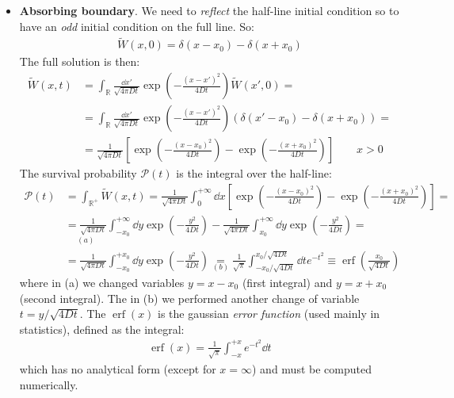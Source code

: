 \documentclass[../template.tex]{subfiles}
\begin{document}
\begin{exo}
    \begin{itemize}
        \item \textbf{Absorbing boundary}. We need to \textit{reflect} the half-line initial condition so to have an \textit{odd} initial condition on the full line. So:
        \begin{align*}
            \tilde{W}(x,0) = \delta(x-x_0)-\delta(x+x_0)
        \end{align*}   
        The full solution is then:
        \begin{align*}
            \tilde{W}(x,t) &= \int_\mathbb{R} \frac{\dd{x'}}{\sqrt{4 \pi Dt}} \exp\left(-\frac{(x-x')^2}{4Dt} \right) \tilde{W}(x',0) =\\
            &= \int_{\mathbb{R}} \frac{\dd{x'}}{\sqrt{4 \pi D t}} \exp\left(-\frac{(x-x')^2}{4Dt} \right) (\delta(x'-x_0) - \delta(x+x_0)) =\\
            &=\frac{1}{\sqrt{4 \pi D t}} \left[\exp\left(-\frac{(x-x_0)^2}{4Dt} \right) - \exp\left(-\frac{(x+x_0)^2}{4Dt} \right)\right] \qquad x>0
        \end{align*}
        The survival probability $\mathcal{P}(t)$ is the integral over the half-line:
        \begin{align}\nonumber
            \mathcal{P}(t) &= \int_{\mathbb{R}^+} \tilde{W}(x,t) =\frac{1}{\sqrt{4 \pi D t}} \int_0^{+\infty} \dd{x} \left[\exp\left(-\frac{(x-x_0)^2}{4Dt} \right) - \exp\left(-\frac{(x+x_0)^2}{4Dt} \right)\right] =\\ \nonumber
            &\underset{(a)}{=\frac{1}{\sqrt{4 \pi D t}}}  \int_{-x_0}^{+\infty} \dd{y} \exp\left(-\frac{y^2}{4Dt} \right) -\frac{1}{\sqrt{4 \pi D t}} \int_{x_0}^{+\infty} \dd{y} \exp\left(-\frac{y^2}{4Dt} \right) =\\ \label{eqn:Psurv}
            &=\frac{1}{\sqrt{4 \pi D t}} \int_{-x_0}^{+x_0} \dd{y} \exp\left(-\frac{y^2}{4Dt} \right) \underset{(b)}{=} \frac{1}{\sqrt{\pi}} \int_{-x_0/\sqrt{4Dt}}^{x_0/\sqrt{4Dt}} \dd{t} e^{-t^2}   \equiv \operatorname{erf}\left(\frac{x_0}{\sqrt{4Dt}} \right) 
        \end{align}
        where in (a) we changed variables $y=x-x_0$ (first integral) and $y=x+x_0$ (second integral). The in (b) we performed another change of variable $t=y/\sqrt{4 Dt}$. The $\operatorname{erf}(x)$ is the gaussian \textit{error function} (used mainly in statistics), defined as the integral:
        \begin{align*}
            \operatorname{erf}(x) = \frac{1}{\sqrt{\pi}}\int_{-x}^{+x} e^{-t^2} \dd{t}  
        \end{align*}  
        which has no analytical form (except for $x=\infty$) and must be computed numerically.


\end{itemize}
\end{exo}
\end{document}
